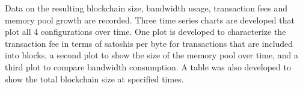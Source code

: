 \documentclass[12pt]{report}
\begin{document}
\begin{table}[]
\centering
\caption{Setup for varying segregated witness activation and block size}
\label{table:exp1}
\end{table}

Data on the resulting blockchain size, bandwidth usage, transaction fees and memory pool growth are recorded. Three time series charts are developed that plot all 4 configurations over time. One plot is developed to characterize the transaction fee in terms of satoshis per byte for transactions that are included into blocks, a second plot to show the size of the memory pool over time, and a third plot to compare bandwidth consumption. A table was also developed to show the total blockchain size at specified times.



\end{document}
